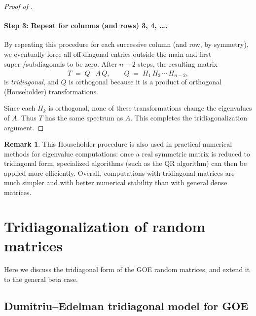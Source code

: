 \documentclass[letterpaper,11pt,oneside,reqno]{book}
\numberwithin{equation}{chapter}  %
\theoremstyle{definition}
\newtheorem{remark}[proposition]{Remark}
\begin{document}
\begin{proof}[Proof of ]
\paragraph{Step 3: Repeat for columns (and rows) 3, 4, \dots.}
By repeating this procedure for each successive column (and row, by symmetry), we eventually force all off-diagonal entries outside the main and first super-/subdiagonals to be zero.  After $n-2$ steps, the resulting matrix
\[
  T
  \;=\;
  Q^\top\,A\,Q,
  \qquad
  Q \;=\; H_1\,H_2\,\cdots\,H_{n-2},
\]
is \emph{tridiagonal}, and $Q$ is orthogonal because it is a product of orthogonal (Householder) transformations.

Since each $H_k$ is orthogonal, none of these transformations change the eigenvalues of $A$.  Thus $T$ has the same spectrum as $A$.  This completes the tridiagonalization argument.
\end{proof}




\begin{remark}
This Householder procedure is also used in practical numerical methods for eigenvalue computations: once a real symmetric matrix is reduced to tridiagonal form, specialized algorithms (such as the QR algorithm) can then be applied more efficiently.
Overall, computations with tridiagonal matrices are much simpler and with better numerical stability than with general dense matrices.
\end{remark}


\section{Tridiagonalization of random matrices}
\label{lecture3:sec:Wigner-SC-detailed}

Here we discuss the tridiagonal form of the GOE random matrices,
and extend it to the general beta case.

\subsection{Dumitriu–Edelman tridiagonal model for GOE}
\end{document}
